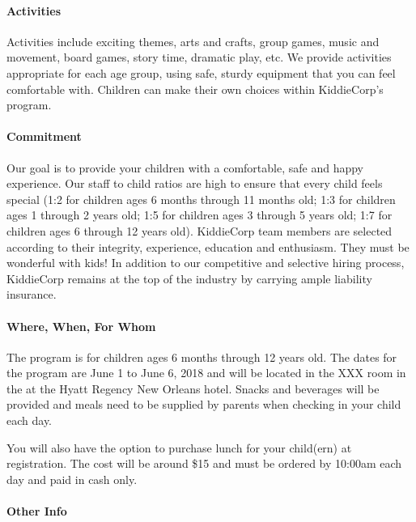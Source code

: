 \paragraph{Activities} Activities include exciting themes, arts  and  crafts, group games, music
and  movement, board games, story time, dramatic play, etc. We provide
activities appropriate for each age group, using safe, sturdy equipment that
you can feel comfortable with. Children can make their own choices within
KiddieCorp's program.


\paragraph{Commitment} Our goal is to provide your children with a comfortable, safe and happy
experience. Our staff to child ratios are high to ensure that every child
feels special (1:2 for children ages 6 months through 11 months old; 1:3 for
children ages 1 through 2 years old; 1:5 for children ages 3 through 5 years
old; 1:7 for children ages 6 through 12 years old). KiddieCorp team members
are selected according to their integrity, experience, education and
enthusiasm. They must be wonderful with kids! In addition to our competitive
and selective hiring process, KiddieCorp remains at the top of the industry
by carrying ample liability insurance.


\paragraph{Where, When, For Whom} The program is for children ages 6 months through 12 years old. The dates
for the program are June 1 to June 6, 2018  and will be located in the XXX
room in the at the Hyatt Regency New Orleans hotel.  Snacks and beverages
will be provided and meals need to be supplied by parents when checking in
your child each day.

You will also have the option to purchase lunch for your child(ern) at
registration. The cost will be around \$15 and must be ordered by 10:00am each day and
paid in cash only. 


\paragraph{Other Info}

